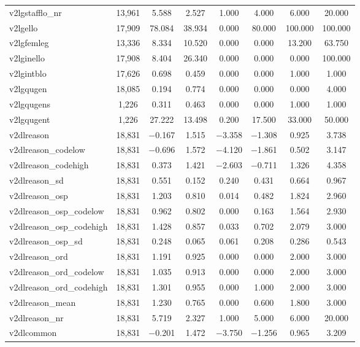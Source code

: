 \begin{table}[!htbp]
\begin{tabular}{@{\extracolsep{5pt}}lccccccc}
v2lgstafflo\_nr & 13,961 & 5.588 & 2.527 & 1.000 & 4.000 & 6.000 & 20.000 \\ 
v2lgello & 17,909 & 78.084 & 38.934 & 0.000 & 80.000 & 100.000 & 100.000 \\ 
v2lgfemleg & 13,336 & 8.334 & 10.520 & 0.000 & 0.000 & 13.200 & 63.750 \\ 
v2lginello & 17,908 & 8.404 & 26.340 & 0.000 & 0.000 & 0.000 & 100.000 \\ 
v2lgintblo & 17,626 & 0.698 & 0.459 & 0.000 & 0.000 & 1.000 & 1.000 \\ 
v2lgqugen & 18,085 & 0.194 & 0.774 & 0.000 & 0.000 & 0.000 & 4.000 \\ 
v2lgqugens & 1,226 & 0.311 & 0.463 & 0.000 & 0.000 & 1.000 & 1.000 \\ 
v2lgqugent & 1,226 & 27.222 & 13.498 & 0.200 & 17.500 & 33.000 & 50.000 \\ 
v2dlreason & 18,831 & $-$0.167 & 1.515 & $-$3.358 & $-$1.308 & 0.925 & 3.738 \\ 
v2dlreason\_codelow & 18,831 & $-$0.696 & 1.572 & $-$4.120 & $-$1.861 & 0.502 & 3.147 \\ 
v2dlreason\_codehigh & 18,831 & 0.373 & 1.421 & $-$2.603 & $-$0.711 & 1.326 & 4.358 \\ 
v2dlreason\_sd & 18,831 & 0.551 & 0.152 & 0.240 & 0.431 & 0.664 & 0.967 \\ 
v2dlreason\_osp & 18,831 & 1.203 & 0.810 & 0.014 & 0.482 & 1.824 & 2.960 \\ 
v2dlreason\_osp\_codelow & 18,831 & 0.962 & 0.802 & 0.000 & 0.163 & 1.564 & 2.930 \\ 
v2dlreason\_osp\_codehigh & 18,831 & 1.428 & 0.857 & 0.033 & 0.702 & 2.079 & 3.000 \\ 
v2dlreason\_osp\_sd & 18,831 & 0.248 & 0.065 & 0.061 & 0.208 & 0.286 & 0.543 \\ 
v2dlreason\_ord & 18,831 & 1.191 & 0.925 & 0.000 & 0.000 & 2.000 & 3.000 \\ 
v2dlreason\_ord\_codelow & 18,831 & 1.035 & 0.913 & 0.000 & 0.000 & 2.000 & 3.000 \\ 
v2dlreason\_ord\_codehigh & 18,831 & 1.301 & 0.955 & 0.000 & 1.000 & 2.000 & 3.000 \\ 
v2dlreason\_mean & 18,831 & 1.230 & 0.765 & 0.000 & 0.600 & 1.800 & 3.000 \\ 
v2dlreason\_nr & 18,831 & 5.719 & 2.327 & 1.000 & 5.000 & 6.000 & 20.000 \\ 
v2dlcommon & 18,831 & $-$0.201 & 1.472 & $-$3.750 & $-$1.256 & 0.965 & 3.209 \\ 

\end{tabular}
\end{table}
